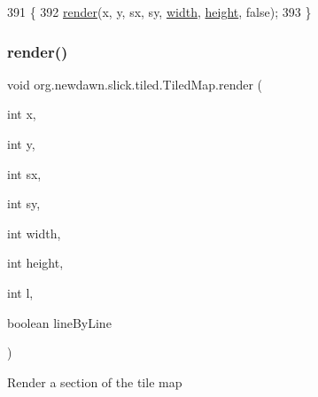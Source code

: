 \begin{DoxyCode}
391                                                                             \{
392         \mbox{\hyperlink{classorg_1_1newdawn_1_1slick_1_1tiled_1_1_tiled_map_a313dd901616b31c772f213675d236389}{render}}(x, y, sx, sy, \mbox{\hyperlink{classorg_1_1newdawn_1_1slick_1_1tiled_1_1_tiled_map_a13b00efd90dfee0ccc7474310e40199e}{width}}, \mbox{\hyperlink{classorg_1_1newdawn_1_1slick_1_1tiled_1_1_tiled_map_a5f9af8e6eb820e35327c4290d14c0bd7}{height}}, \textcolor{keyword}{false});
393     \}
\end{DoxyCode}
\mbox{\label{classorg_1_1newdawn_1_1slick_1_1tiled_1_1_tiled_map_a379329f5ea96f9fffcc9a55d18d32312}} 
\subsubsection{\texorpdfstring{render()}{render()}\hspace{0.1cm}{\footnotesize\ttfamily [4/5]}}
{\footnotesize\ttfamily void org.\+newdawn.\+slick.\+tiled.\+Tiled\+Map.\+render (\begin{DoxyParamCaption}\item[{int}]{x,  }\item[{int}]{y,  }\item[{int}]{sx,  }\item[{int}]{sy,  }\item[{int}]{width,  }\item[{int}]{height,  }\item[{int}]{l,  }\item[{boolean}]{line\+By\+Line }\end{DoxyParamCaption})\hspace{0.3cm}{\ttfamily [inline]}}

Render a section of the tile map


